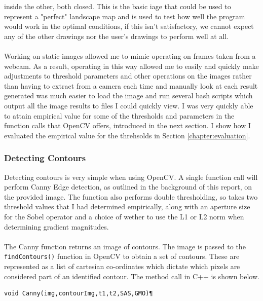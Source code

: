 \documentclass[11pt]{article}
\begin{document}
inside the other, both closed. This is the basic iage that could be used to
represent a "perfect" landscape map and is used to test how well the program
would work in the optimal conditions, if this isn't satisfactory, we cannot
expect any of the other drawings nor the user's drawings to perform well at all.\\
\\
Working on static images allowed me to mimic operating on frames taken from
a webcam. As a result, operating in this way allowed me to easily and quickly 
make adjustments to threshold parameters and other operations on the images
rather than having to extract from a camera each time and manually look at each
result generated was much easier to load the image and run several 
bash scripts which output all the image results to files I could quickly view.
I was very quickly able to attain empirical value for some of the thresholds
and parameters in the function calls that OpenCV offers, introduced
in the next section. I show how I evaluated the empirical value 
for the threhsolds in Section \ref{chapter:evaluation}.

\subsubsection{Detecting Contours}
Detecting contours is very simple when using OpenCV. A single function call
will perform Canny Edge detection, as outlined in the background of this report,
on the provided image. The function also performs double thresholding, so takes
two threshold values that I had determined empirically, along with an
aperture size for the Sobel operator and a choice of wether to use the L1 or L2 norm
when determining gradient magnitudes.\\
\\
The Canny function returns an image of contours. The image is 
passed to the \texttt{findContours()} function in OpenCV to obtain a set
of contours. These are represented as
a list of cartesian co-ordinates which dictate which pixels are considered part
of an identified contour. The method call in C++ is shown below.

\begin{lstlisting}
void Canny(img,contourImg,t1,t2,SAS,GMO)¶
\end{lstlisting}
\end{document}
